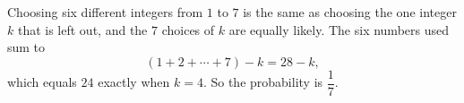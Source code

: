 Choosing six different integers from $1$ to $7$ is the same as choosing the one integer $k$ that is left out, and the $7$ choices of $k$ are equally likely. The six numbers used sum to
\[
(1+2+\cdots+7)-k=28-k ,
\]
which equals $24$ exactly when $k=4$. So the probability is $\boxed{\dfrac{1}{7}}$.
